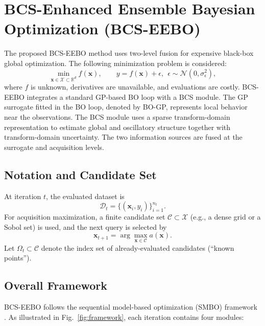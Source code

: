 \documentclass[lettersize,journal]{IEEEtran}
\begin{document}
\section{BCS-Enhanced Ensemble Bayesian Optimization (BCS-EEBO)}
\label{sec:method}

The proposed BCS-EEBO method uses two-level fusion for expensive black-box global optimization. The following minimization problem is considered:
\begin{equation}
\label{eq:problem}
\min_{\mathbf{x}\in\mathcal{X}\subset\mathbb{R}^d} f(\mathbf{x}), \qquad
y = f(\mathbf{x}) + \epsilon,\ \ \epsilon\sim\mathcal{N}(0,\sigma_\epsilon^2),
\end{equation}
where $f$ is unknown, derivatives are unavailable, and evaluations are costly. BCS-EEBO integrates a standard GP-based BO loop with a BCS module. The GP surrogate fitted in the BO loop, denoted by BO-GP, represents local behavior near the observations. The BCS module uses a sparse transform-domain representation to estimate global and oscillatory structure together with transform-domain uncertainty. The two information sources are fused at the surrogate and acquisition levels.

\subsection{Notation and Candidate Set}
\label{subsec:notation}

At iteration $t$, the evaluated dataset is
\begin{equation}
\mathcal{D}_t=\{(\mathbf{x}_i,y_i)\}_{i=1}^{n_t}.
\end{equation}
For acquisition maximization, a finite candidate set $\mathcal{C}\subset\mathcal{X}$ (e.g., a dense grid or a Sobol set) is used, and the next query is selected by
\begin{equation}
\label{eq:next}
\mathbf{x}_{t+1} = \arg\max_{\mathbf{x}\in\mathcal{C}} a(\mathbf{x}).
\end{equation}
Let $\Omega_t\subset\mathcal{C}$ denote the index set of already-evaluated candidates (``known points'').

\subsection{Overall Framework}
\label{subsec:overall_framework}

BCS-EEBO follows the sequential model-based optimization (SMBO) framework \cite{bergstra2011algorithms}. As illustrated in Fig.~\ref{fig:framework}, each iteration contains four modules:
\end{document}
